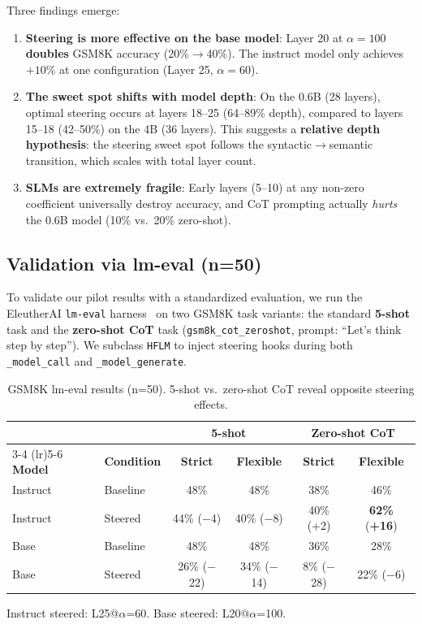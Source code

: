 \documentclass[11pt,a4paper]{article}
\begin{document}
Three findings emerge:

\begin{enumerate}
    \item \textbf{Steering is more effective on the base model}: Layer 20 at $\alpha=100$ \textbf{doubles} GSM8K accuracy (20\%$\to$40\%). The instruct model only achieves $+10\%$ at one configuration (Layer 25, $\alpha=60$).
    \item \textbf{The sweet spot shifts with model depth}: On the 0.6B (28 layers), optimal steering occurs at layers 18--25 (64--89\% depth), compared to layers 15--18 (42--50\%) on the 4B (36 layers). This suggests a \textbf{relative depth hypothesis}: the steering sweet spot follows the syntactic$\to$semantic transition, which scales with total layer count.
    \item \textbf{SLMs are extremely fragile}: Early layers (5--10) at any non-zero coefficient universally destroy accuracy, and CoT prompting actually \textit{hurts} the 0.6B model (10\% vs.\ 20\% zero-shot).
\end{enumerate}

\subsection{Validation via lm-eval (n=50)}

To validate our pilot results with a standardized evaluation, we run the EleutherAI \texttt{lm-eval} harness~\cite{eval-harness} on two GSM8K task variants: the standard \textbf{5-shot} task and the \textbf{zero-shot CoT} task (\texttt{gsm8k\_cot\_zeroshot}, prompt: ``Let's think step by step''). We subclass \texttt{HFLM} to inject steering hooks during both \texttt{\_model\_call} and \texttt{\_model\_generate}.

\begin{table}[H]
\centering
\caption{GSM8K lm-eval results (n=50). 5-shot vs.\ zero-shot CoT reveal opposite steering effects.}
\label{tab:gsm8k_lmeval}
\small
\begin{tabular}{llcccc}
\toprule
& & \multicolumn{2}{c}{\textbf{5-shot}} & \multicolumn{2}{c}{\textbf{Zero-shot CoT}} \\
\cmidrule(lr){3-4} \cmidrule(lr){5-6}
\textbf{Model} & \textbf{Condition} & \textbf{Strict} & \textbf{Flexible} & \textbf{Strict} & \textbf{Flexible} \\
\midrule
Instruct & Baseline & 48\% & 48\% & 38\% & 46\% \\
Instruct & Steered & 44\% {\scriptsize($-$4)} & 40\% {\scriptsize($-$8)} & 40\% {\scriptsize(+2)} & \textbf{62\%} {\scriptsize(\textbf{+16})} \\
\midrule
Base & Baseline & 48\% & 48\% & 36\% & 28\% \\
Base & Steered & 26\% {\scriptsize($-$22)} & 34\% {\scriptsize($-$14)} & 8\% {\scriptsize($-$28)} & 22\% {\scriptsize($-$6)} \\
\bottomrule
\end{tabular}
\vspace{2pt}

{\footnotesize Instruct steered: L25@$\alpha$=60. Base steered: L20@$\alpha$=100.}
\end{table}
\end{document}
